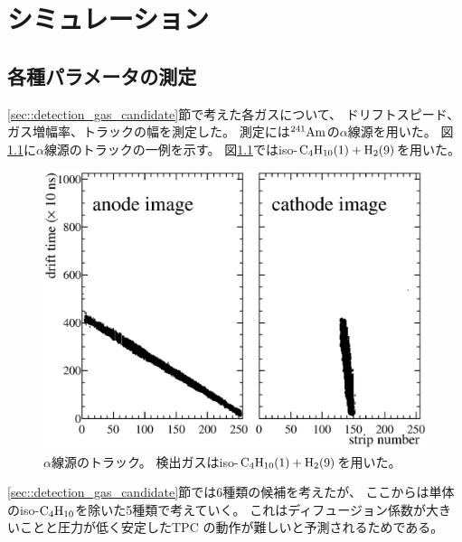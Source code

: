 \documentclass[../master]{subfiles}
\begin{document}
\chapter{シミュレーション}
\label{chap::simulation}
\section{各種パラメータの測定}
\ref{sec::detection_gas_candidate}節で考えた各ガスについて、
ドリフトスピード、ガス増幅率、トラックの幅を測定した。
測定には${}^{241}{\rm Am}$の$\alpha$線源を用いた。
図\ref{fig::a_source_track}に$\alpha$線源のトラックの一例を示す。
図\ref{fig::a_source_track}ではiso-$\rm C_{4}H_{10} (1) + H_{2} (9)$を用いた。
\begin{figure}
  \centering
  \includegraphics[clip, width=0.9\columnwidth]{0210_7.eps}
  \caption[$\alpha$線源のトラック。]
          {$\alpha$線源のトラック。
          検出ガスはiso-$\rm C_{4}H_{10} (1) + H_{2} (9)$を用いた。}
  \label{fig::a_source_track}
\end{figure}
\ref{sec::detection_gas_candidate}節では6種類の候補を考えたが、
ここからは単体のiso-$\rm C_{4}H_{10}$を除いた5種類で考えていく。
これはディフュージョン係数が大きいことと圧力が低く安定したTPC の動作が難しいと予測されるためである。
\end{document}
